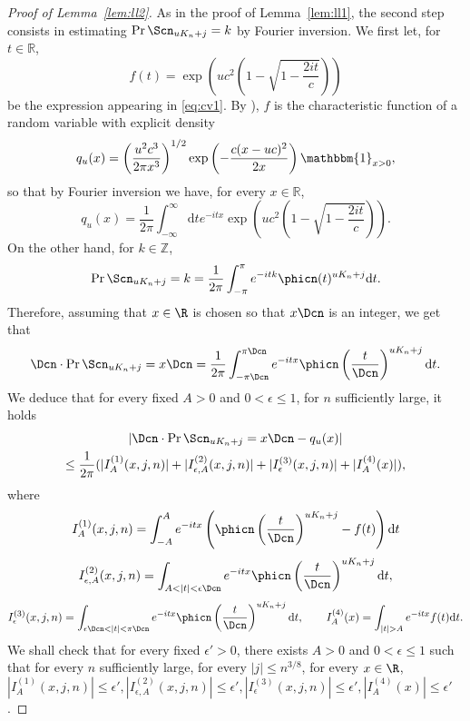\begin{proof}[Proof of Lemma~\ref{lem:ll2}]
 As in the proof of Lemma~\ref{lem:ll1}, the second step consists in estimating $\Pr{\Scn_{ uK_{n}  +j}=k}$ by Fourier inversion.
 We first let, for $t \in \mathbb{R}$,
\[f(t)=\exp \left( u c^{2} \left( 1 -\sqrt{1-  \frac{2it}{c}}  \right)  \right)\]
be the expression appearing in \eqref{eq:cv1}.
By \cite[Sec.1.2.5]{Kyp06}),  $f$ is the characteristic function of a random variable with explicit density
\[q_u(x)=\left( \frac{u^{2} c^{3}}{2 \pi x^{3}} \right)^{1/2} \exp \left(  - \frac{c (x-uc)^{2} }{2x} \right) \mathbbm{1}_{x>0},\]
so that by Fourier inversion we have, for every $x \in \mathbb{R}$,
\begin{equation}
 \label{eq:fourier}
 q_u(x)=  \frac{1}{2\pi}\int_{-\infty}^{\infty}  {\mathrm{d}t} e^{-itx} \exp \left( u c^{2} \left( 1 -\sqrt{1-  \frac{2it}{c}}  \right)  \right).
 \end{equation}
On the other hand,
for $k \in \mathbb{Z}$,
\[ \Pr{\Scn_{ uK_{n}  +j}=k} = \frac{1}{2\pi} \int_{-\pi}^{\pi} e^{-itk} \phicn(t)^{ uK_{n}  +j} {\mathrm{d}}t.\]
Therefore, assuming that $x \in \R$ is chosen so that $x \Dcn$ is an integer, we get that
\[ \Dcn \cdot \Pr{\Scn_{ uK_{n}  +j}=x  \Dcn}=  \frac{1}{2\pi} \int^{\pi \Dcn}_{-\pi \Dcn} e^{- i t x} \phicn \left(  \frac{t}{\Dcn} \right) ^{ uK_{n}  +j} {\mathrm{d}}t.\]
We deduce that for every fixed $A>0$ and $0< \epsilon \leq 1$, for $n$ sufficiently large, it holds
\begin{multline*}
  \left| \Dcn \cdot \Pr{\Scn_{ uK_{n}  +j}=x  \Dcn} - q_{u}(x)\right| \\
  \leq \frac{1}{2 \pi} (|I^{(1)}_{A}(x,j,n)| + |I^{(2)}_{\epsilon,A}(x,j,n)|+|I^{(3)}_{\epsilon}(x,j,n)|+|I^{(4)}_{A}(x)|),
\end{multline*}
where
\[I^{(1)}_{A}(x,j,n)=\int_{-A}^{A} e^{-i t x} \left(  \phicn \left(  \frac{t}{\Dcn} \right) ^{ uK_{n}  +j}- f(t) \right) {\mathrm{d}}t\]
\[ I^{(2)}_{\epsilon,A}(x,j,n)= \int_{A<|t|< \epsilon \Dcn} e^{-itx} \phicn \left(  \frac{t}{\Dcn} \right) ^{ uK_{n}  +j}{\mathrm{d}}t,\]
\[ I^{(3)}_{\epsilon}(x,j,n)=\int_{\epsilon \Dcn<|t|<\pi \Dcn} e^{-itx} \phicn  \left(  \frac{t}{\Dcn} \right) ^{ uK_{n}  +j} {\mathrm{d}}t, \qquad I^{(4)}_{A}(x)= \int_{|t|>A} e^{-itx} f(t) {\mathrm{d}}t .\]
We shall check that for every fixed $\epsilon'>0$, there exists $A>0$ and $0 < \epsilon \leq 1$ such that for every $n$ sufficiently large, for every $|j| \leq n^{3/8}$, for every $x \in \R$,
 $|I^{(1)}_{A}(x,j,n)| \leq \epsilon', |I^{(2)}_{\epsilon,A}(x,j,n)| \leq \epsilon', |I^{(3)}_{\epsilon}(x,j,n)| \leq \epsilon', |I^{(4)}_{A}(x)| \leq\epsilon'$.



\end{proof}
